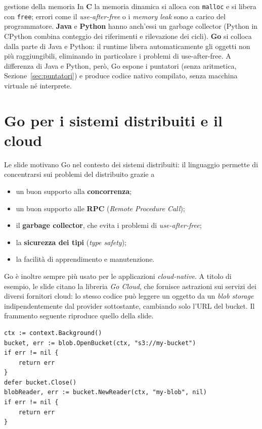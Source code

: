 \documentclass[11pt,a4paper]{report}
\newcommand{\cod}[1]{\texttt{#1}}
\begin{document}
\begin{confronto}{gestione della memoria}
In \textbf{C} la memoria dinamica si alloca con \cod{malloc} e si libera con
\cod{free}; errori come il \emph{use-after-free} o i \emph{memory leak} sono a
carico del programmatore. \textbf{Java} e \textbf{Python} hanno anch'essi un
garbage collector (Python in CPython combina conteggio dei riferimenti e
rilevazione dei cicli). \textbf{Go} si colloca dalla parte di Java e Python:
il runtime libera automaticamente gli oggetti non più raggiungibili, eliminando
in particolare i problemi di use-after-free. A differenza di Java e Python, però,
Go espone i puntatori (senza aritmetica, Sezione~\ref{sec:puntatori}) e produce
codice nativo compilato, senza macchina virtuale né interprete.
\end{confronto}

\section{Go per i sistemi distribuiti e il cloud}

Le slide motivano Go nel contesto dei sistemi distribuiti: il linguaggio permette
di concentrarsi sui problemi del distribuito grazie a

\begin{itemize}
  \item un buon supporto alla \textbf{concorrenza};
  \item un buon supporto alle \textbf{RPC} (\emph{Remote Procedure Call});
  \item il \textbf{garbage collector}, che evita i problemi di \emph{use-after-free};
  \item la \textbf{sicurezza dei tipi} (\emph{type safety});
  \item la facilità di apprendimento e manutenzione.
\end{itemize}

Go è inoltre sempre più usato per le applicazioni \emph{cloud-native}. A titolo di
esempio, le slide citano la libreria \emph{Go Cloud}, che fornisce astrazioni sui
servizi dei diversi fornitori cloud: lo stesso codice può leggere un oggetto da
un \emph{blob storage} indipendentemente dal provider sottostante, cambiando solo
l'URL del bucket. Il frammento seguente riproduce quello della slide.

\begin{lstlisting}[style=gocode,caption={Frammento della slide sul Go Cloud (non eseguibile in isolamento)}]
ctx := context.Background()
bucket, err := blob.OpenBucket(ctx, "s3://my-bucket")
if err != nil {
	return err
}
defer bucket.Close()
blobReader, err := bucket.NewReader(ctx, "my-blob", nil)
if err != nil {
	return err
}
\end{lstlisting}
\end{document}
